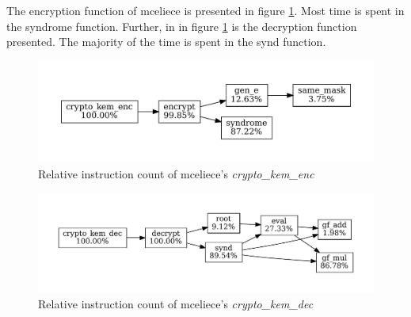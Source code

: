 The encryption function of \gls{mceliece} is presented in figure \ref{figure:result:hot-paths:classic-mceliece:crypto_kem_enc}. Most time is spent in the syndrome function. Further, in in figure \ref{figure:result:hot-paths:classic-mceliece:crypto_kem_enc} is the decryption function presented. The majority of the time is spent in the synd function.

\begin{figure}[H]
    \centering
    \includegraphics[scale=0.5]{chapters/results/hot-paths/classic-mceliece/8192128/crypto_kem_enc.pdf}
    \caption{Relative instruction count of \gls{mceliece}'s \textit{crypto\_kem\_enc}}
    \label{figure:result:hot-paths:classic-mceliece:crypto_kem_enc}
\end{figure}


\begin{figure}[H]
    \centering
    \includegraphics[scale=0.5]{chapters/results/hot-paths/classic-mceliece/8192128/crypto_kem_dec.pdf}
    \caption{Relative instruction count of \gls{mceliece}'s \textit{crypto\_kem\_dec}}
    \label{figure:result:hot-paths:classic-mceliece:crypto_kem_dec}
\end{figure}



